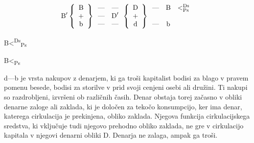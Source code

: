 \documentclass[kapital_02.tex]{subfiles}
\begin{document}
\[
    \textrm{B}'\left\{
    \begin{array}{c}
        \textrm{B}\\
        +\\
        \textrm{b}\\
    \end{array}
    \right\}
    \begin{array}{c c}
        \textrm{---} & \textrm{---}\\
        \textrm{---} & \textrm{D}'\\
        \textrm{---} & \textrm{---}\\
    \end{array}
    \left\{
    \begin{array}{c}
        \textrm{D}\\
        +\\
        \textrm{d}\\
    \end{array}
    \right\}
    \begin{array}{c c c}
        \textrm{---} & \textrm{B} & < ^{\textrm{Ds}}_{\textrm{Ps}}\\
         & & \\
        \textrm{---} & \textrm{b} & \\
    \end{array}
\]


B<\textsuperscript{Ds}\textsubscript{Ps}

B<\textsubscript{Ps}


d---b je vrsta nakupov z denarjem, ki ga troši kapitalist bodisi za blago v pravem pomenu besede, bodisi za storilve v prid svoji cenjeni osebi ali družini. Ti nakupi so razdrobljeni, izvršeni ob različnih časih. Denar obstaja torej začasno v obliki denarne zaloge ali zaklada, ki je določen za tekočo konsumpcijo, ker ima denar, katerega cirkulacija je prekinjena, obliko zaklada. Njegova funkcija cirkulacijskega sredstva, ki vključuje tudi njegovo prehodno obliko zaklada, ne gre v cirkulacijo kapitala v njegovi denarni obliki D. Denarja ne zalaga, ampak ga troši.
\end{document}
